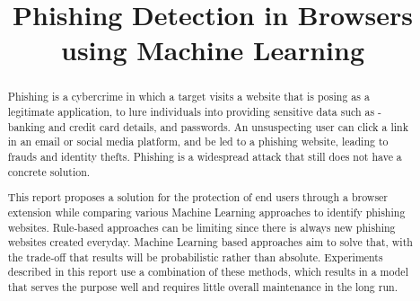 \documentclass[conference]{IEEEtran}
\begin{document}
\title{Phishing Detection in Browsers \linebreak using Machine Learning\\
}

\author{
    \and

}

\maketitle

\begin{abstract}

    Phishing is a cybercrime in which a target visits a website that is posing as a legitimate application, to lure individuals into providing sensitive data such as - banking and credit card details, and passwords.
    An unsuspecting user can click a link in an email or social media platform, and be led to a phishing website, leading to frauds and identity thefts.
    Phishing is a widespread attack that still does not have a concrete solution.
    \par This report proposes a solution for the protection of end users through a browser extension while comparing various Machine Learning approaches to identify phishing websites.
    Rule-based approaches can be limiting since there is always new phishing websites created everyday. Machine Learning based approaches aim to solve that, with the trade-off that results will be probabilistic rather than absolute. Experiments described in this report use a combination of these methods, which results in a model that serves the purpose well and requires little overall maintenance in the long run.
\end{abstract}
\end{document}
